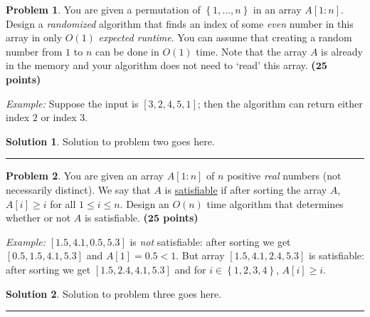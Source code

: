 \documentclass{article}
\theoremstyle{definition}
\newtheorem{problem}{Problem}
\def\fline{\rule{0.75\linewidth}{0.5pt}}
\newcommand{\finishline}{\vspace{-15pt}\begin{center}\fline\end{center}}
\newtheorem*{solution*}{Solution}
\newenvironment{solution}{\begin{solution*}}{{\finishline} \end{solution*}}
\newcommand{\grade}[1]{\hfill{\textbf{($\mathbf{#1}$ points)}}}
\newcommand{\set}[1]{\ensuremath{\left\{ #1 \right\}}}
\begin{document}
\begin{problem}
	You are given a permutation of $\set{1,\ldots,n}$ in an array $A[1:n]$. Design a \emph{randomized} algorithm that finds an index of some \emph{even} number 
	in this array in only $O(1)$ \emph{expected runtime}. You can assume that 
	creating a random number from $1$ to $n$ can be done in $O(1)$ time. Note that the array $A$ is already in the memory and your algorithm does not need to `read' this array.  \grade{25}
	
	\emph{Example:} Suppose the input is $[3,2,4,5,1]$; then the algorithm can return either index $2$ or index $3$. 	
\end{problem}

\smallskip

\begin{solution}
	Solution to problem two goes here. 
\end{solution}


\smallskip


\begin{problem}
	You are given an array $A[1:n]$ of $n$ positive \emph{real} numbers (not necessarily distinct). We say that $A$ is \underline{satisfiable} if after sorting the array $A$, $A[i] \geq i$ for all $1 \leq i \leq n$. 
	Design an $O(n)$ time algorithm that determines whether or not $A$ is satisfiable. \grade{25}
	
	\emph{Example:} $[1.5,4.1,0.5,5.3]$ is \emph{not} satisfiable: after sorting  we get $[0.5,1.5,4.1,5.3]$ and $A[1] = 0.5 < 1$. But array $[1.5,4.1,2.4,5.3]$ is satisfiable:
	 after sorting  we get $[1.5,2.4,4.1,5.3]$ and for $i \in \set{1,2,3,4}$, $A[i] \geq i$. 
	
\end{problem}

\smallskip

\begin{solution}
	Solution to problem three goes here. 
\end{solution}

\smallskip
\end{document}
